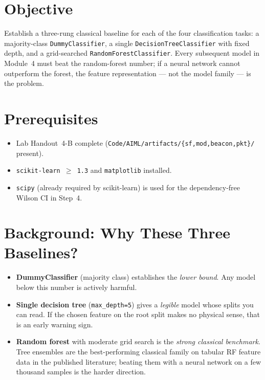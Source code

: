 \documentclass[11pt,letterpaper]{article}
\begin{document}

\section{Objective}
Establish a three-rung classical baseline for each of the four classification tasks: a majority-class \texttt{DummyClassifier}, a single \texttt{DecisionTreeClassifier} with fixed depth, and a grid-searched \texttt{RandomForestClassifier}. Every subsequent model in Module~4 must beat the random-forest number; if a neural network cannot outperform the forest, the feature representation --- not the model family --- is the problem.

\section{Prerequisites}
\begin{itemize}[leftmargin=2em]
	\item Lab Handout~4-B complete (\texttt{Code/AIML/artifacts/\{sf,mod,beacon,pkt\}/} present).
	\item \texttt{scikit-learn $\geq$ 1.3} and \texttt{matplotlib} installed.
	\item \texttt{scipy} (already required by scikit-learn) is used for the dependency-free Wilson CI in Step~4.
\end{itemize}

\section{Background: Why These Three Baselines?}
\begin{itemize}[leftmargin=2em]
	\item \textbf{DummyClassifier} (majority class) establishes the \emph{lower bound}. Any model below this number is actively harmful.
	\item \textbf{Single decision tree} (\texttt{max\_depth=5}) gives a \emph{legible} model whose splits you can read. If the chosen feature on the root split makes no physical sense, that is an early warning sign.
	\item \textbf{Random forest} with moderate grid search is the \emph{strong classical benchmark}. Tree ensembles are the best-performing classical family on tabular \mbox{RF} feature data in the published literature; beating them with a neural network on a few thousand samples is the harder direction.
\end{itemize}
\end{document}
